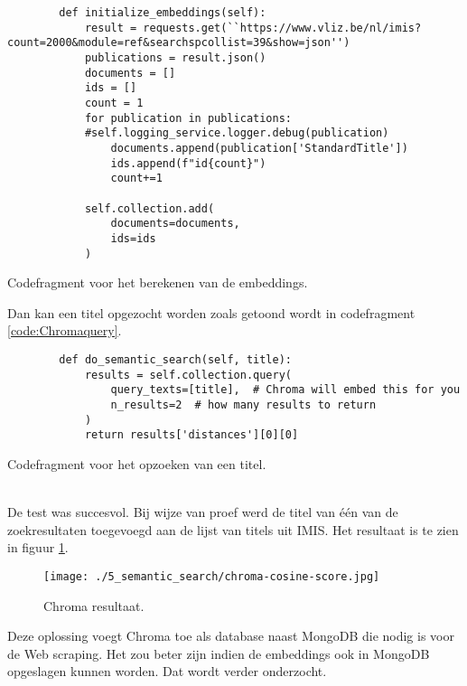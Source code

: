 \begin{listing}
    \begin{verbatim}
        def initialize_embeddings(self):
            result = requests.get(``https://www.vliz.be/nl/imis?count=2000&module=ref&searchspcollist=39&show=json'')
            publications = result.json()
            documents = []
            ids = []
            count = 1
            for publication in publications:
            #self.logging_service.logger.debug(publication)
                documents.append(publication['StandardTitle'])
                ids.append(f"id{count}")
                count+=1
        
            self.collection.add(
                documents=documents,
                ids=ids
            )
    \end{verbatim}
    \caption[Embeddings codefragment]{Codefragment voor het berekenen van de embeddings.}
    \label{code:Chromaembeddings}
\end{listing}
Dan kan een titel opgezocht worden zoals getoond wordt in codefragment \ref{code:Chromaquery}.
\begin{listing}
    \begin{verbatim}
        def do_semantic_search(self, title):
            results = self.collection.query(
                query_texts=[title],  # Chroma will embed this for you
                n_results=2  # how many results to return
            )
            return results['distances'][0][0]
    \end{verbatim}
    \caption[Query codefragment]{Codefragment voor het opzoeken van een titel.}
    \label{code:Chromaquery}
\end{listing}
\\
De test was succesvol. Bij wijze van proef werd de titel van één van de zoekresultaten toegevoegd aan de lijst van titels uit IMIS. Het resultaat is te zien in figuur \ref{fig:Chroma}.
\begin{figure}
    \centering
    \texttt{[image: ./5\_semantic\_search/chroma-cosine-score.jpg]}
    \caption[Chroma resultaat.]{\label{fig:Chroma}Chroma resultaat.}
\end{figure}
Deze oplossing voegt Chroma toe als database naast MongoDB die nodig is voor de Web scraping. Het zou beter zijn indien de embeddings ook in MongoDB opgeslagen kunnen worden. Dat wordt verder onderzocht.
